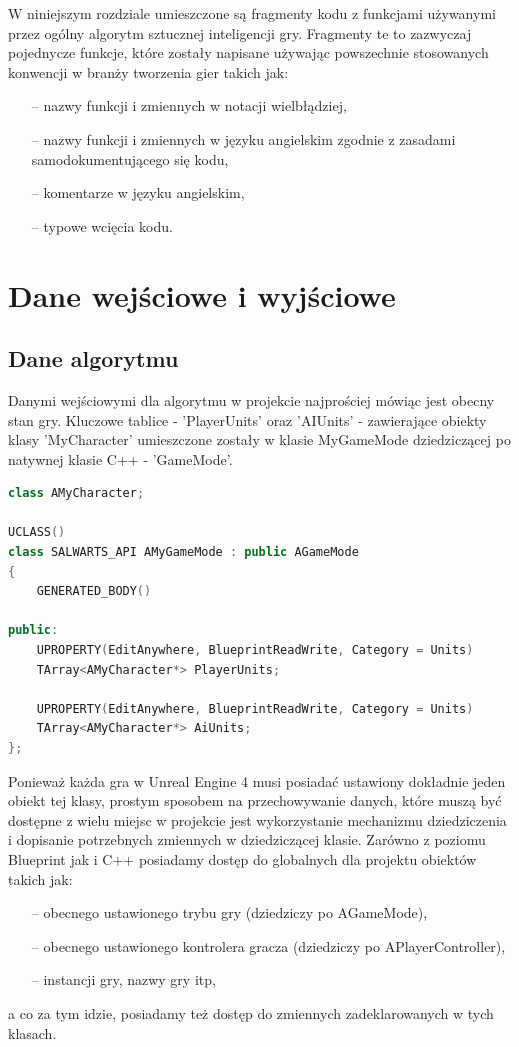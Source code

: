 \documentclass[12pt]{report}
\begin{document}
W niniejszym rozdziale umieszczone są fragmenty kodu z funkcjami używanymi przez ogólny algorytm sztucznej inteligencji gry. Fragmenty te to zazwyczaj pojednycze funkcje, które zostały napisane używając powszechnie stosowanych konwencji w branży tworzenia gier takich jak:
\begin{itemize}
\item[--] nazwy funkcji i zmiennych w notacji wielbłądziej,
\item[--] nazwy funkcji i zmiennych w języku angielskim zgodnie z zasadami samodokumentującego się kodu,
\item[--] komentarze w języku angielskim,
\item[--] typowe wcięcia kodu.
\end{itemize}

\section{Dane wejściowe i wyjściowe}
\subsection{Dane algorytmu}
Danymi wejściowymi dla algorytmu w projekcie najprościej mówiąc jest obecny stan gry. Kluczowe tablice - 'PlayerUnits' oraz 'AIUnits' - zawierające obiekty klasy 'MyCharacter' umieszczone zostały w klasie MyGameMode dziedziczącej po natywnej klasie C++ - 'GameMode'. 

\begin{lstlisting}[language=C++, backgroundcolor=\color{black!5}, basicstyle=\footnotesize, caption=Klasa AMyGameMode.h.]
   class AMyCharacter;

UCLASS()
class SALWARTS_API AMyGameMode : public AGameMode
{
	GENERATED_BODY()

public:
	UPROPERTY(EditAnywhere, BlueprintReadWrite, Category = Units)
	TArray<AMyCharacter*> PlayerUnits;

	UPROPERTY(EditAnywhere, BlueprintReadWrite, Category = Units)
	TArray<AMyCharacter*> AiUnits;
};
\end{lstlisting}



Ponieważ każda gra w Unreal Engine 4 musi posiadać ustawiony dokładnie jeden obiekt tej klasy, prostym sposobem na przechowywanie danych, które muszą być dostępne z wielu miejsc w projekcie jest wykorzystanie mechanizmu dziedziczenia i dopisanie potrzebnych zmiennych w dziedziczącej klasie. Zarówno z poziomu Blueprint jak i C++ posiadamy dostęp do globalnych dla projektu obiektów takich jak: 
\begin{itemize}
\item[--] obecnego ustawionego trybu gry (dziedziczy po AGameMode),
\item[--] obecnego ustawionego kontrolera gracza (dziedziczy po APlayerController),
\item[--] instancji gry, nazwy gry itp,
\end{itemize}
a co za tym idzie, posiadamy też dostęp do zmiennych zadeklarowanych w tych klasach. 
\end{document}
